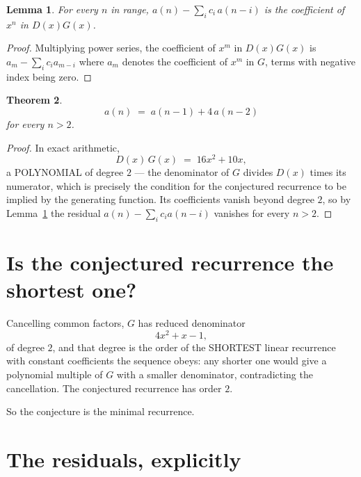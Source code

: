 \documentclass[11pt,a4paper]{article}
\theoremstyle{plain}
\newtheorem{theorem}{Theorem}
\newtheorem{lemma}[theorem]{Lemma}
\theoremstyle{definition}
\begin{document}
\begin{lemma}\label{lem:key}
For every $n$ in range, $a(n)-\sum_i c_i\,a(n-i)$ is the coefficient of $x^{n}$ in
$D(x)G(x)$.
\end{lemma}

\begin{proof}
Multiplying power series, the coefficient of $x^{m}$ in $D(x)G(x)$ is
$a_m-\sum_i c_i a_{m-i}$ where $a_m$ denotes the coefficient of $x^{m}$ in $G$, terms with
negative index being zero.
\end{proof}

\begin{theorem}
\[
a(n)\;=\;a(n-1) + 4\,a(n-2)
\]
for every $n>2$.
\end{theorem}

\begin{proof}
In exact arithmetic,
\[
D(x)\,G(x)\;=\;16 x^{2} + 10 x,
\]
a POLYNOMIAL of degree $2$ --- the denominator of $G$ divides $D(x)$ times its numerator,
which is precisely the condition for the conjectured recurrence to be implied by the
generating function. Its coefficients vanish beyond degree $2$, so by
Lemma~\ref{lem:key} the residual $a(n)-\sum_ic_ia(n-i)$ vanishes for every
$n>2$.
\end{proof}

\section{Is the conjectured recurrence the shortest one?}

Cancelling common factors, $G$ has reduced denominator
\[
4 x^{2} + x - 1,
\]
of degree $2$, and that degree is the order of the SHORTEST linear recurrence with
constant coefficients the sequence obeys: any shorter one would give a polynomial multiple of
$G$ with a smaller denominator, contradicting the cancellation. The conjectured recurrence has
order $2$.

So the conjecture is the minimal recurrence.

\section{The residuals, explicitly}
\end{document}
